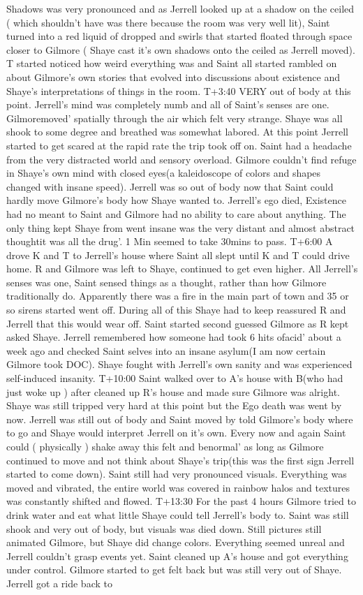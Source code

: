 \documentclass[12pt]{book}
\begin{document}
Shadows was very pronounced and as Jerrell looked up at a shadow on the ceiled ( which shouldn't have was there because the room was very well lit), Saint turned into a red liquid of dropped and swirls that started floated through space closer to Gilmore ( Shaye cast it's own shadows onto the ceiled as Jerrell moved). T started noticed how weird everything was and Saint all started rambled on about Gilmore's own stories that evolved into discussions about existence and Shaye's interpretations of things in the room. T+3:40 VERY out of body at this point. Jerrell's mind was completely numb and all of Saint's senses are one. Gilmoremoved' spatially through the air which felt very strange. Shaye was all shook to some degree and breathed was somewhat labored. At this point Jerrell started to get scared at the rapid rate the trip took off on. Saint had a headache from the very distracted world and sensory overload. Gilmore couldn't find refuge in Shaye's own mind with closed eyes(a kaleidoscope of colors and shapes changed with insane speed). Jerrell was so out of body now that Saint could hardly move Gilmore's body how Shaye wanted to. Jerrell's ego died, Existence had no meant to Saint and Gilmore had no ability to care about anything. The only thing kept Shaye from went insane was the very distant and almost abstract thoughtit was all the drug'. 1 Min seemed to take 30mins to pass. T+6:00 A drove K and T to Jerrell's house where Saint all slept until K and T could drive home. R and Gilmore was left to Shaye, continued to get even higher. All Jerrell's senses was one, Saint sensed things as a thought, rather than how Gilmore traditionally do. Apparently there was a fire in the main part of town and 35 or so sirens started went off. During all of this Shaye had to keep reassured R and Jerrell that this would wear off. Saint started second guessed Gilmore as R kept asked Shaye. Jerrell remembered how someone had took 6 hits ofacid' about a week ago and checked Saint selves into an insane asylum(I am now certain Gilmore took DOC). Shaye fought with Jerrell's own sanity and was experienced self-induced insanity. T+10:00 Saint walked over to A's house with B(who had just woke up ) after cleaned up R's house and made sure Gilmore was alright. Shaye was still tripped very hard at this point but the Ego death was went by now. Jerrell was still out of body and Saint moved by told Gilmore's body where to go and Shaye would interpret Jerrell on it's own. Every now and again Saint could ( physically ) shake away this felt and benormal' as long as Gilmore continued to move and not think about Shaye's trip(this was the first sign Jerrell started to come down). Saint still had very pronounced visuals. Everything was moved and vibrated, the entire world was covered in rainbow halos and textures was constantly shifted and flowed. T+13:30 For the past 4 hours Gilmore tried to drink water and eat what little Shaye could tell Jerrell's body to. Saint was still shook and very out of body, but visuals was died down. Still pictures still animated Gilmore, but Shaye did change colors. Everything seemed unreal and Jerrell couldn't grasp events yet. Saint cleaned up A's house and got everything under control. Gilmore started to get felt back but was still very out of Shaye. Jerrell got a ride back to 
\end{document}
